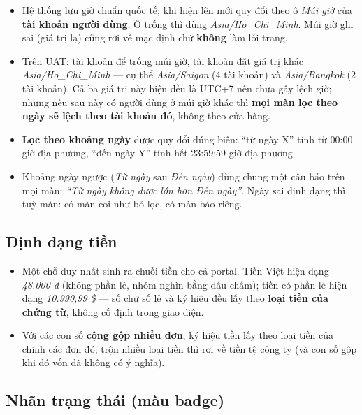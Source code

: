 \begin{itemize}[leftmargin=*]
  \item Hệ thống lưu giờ chuẩn quốc tế; khi hiện lên mới quy đổi theo ô \emph{Múi giờ} của
        \textbf{tài khoản người dùng}. Ô trống thì dùng \emph{Asia/Ho\_Chi\_Minh}. Múi giờ ghi
        sai (giá trị lạ) cũng rơi về mặc định chứ \textbf{không} làm lỗi trang.
  \item Trên UAT:  tài khoản để trống múi giờ,  tài khoản đặt giá trị khác
        \emph{Asia/Ho\_Chi\_Minh} --- cụ thể \emph{Asia/Saigon} (4 tài khoản) và
        \emph{Asia/Bangkok} (2 tài khoản). Cả ba giá trị này hiện đều là UTC+7 nên chưa gây
        lệch giờ; nhưng nếu sau này có người dùng ở múi giờ khác thì \textbf{mọi màn lọc theo
        ngày sẽ lệch theo tài khoản đó}, không theo cửa hàng.
  \item \textbf{Lọc theo khoảng ngày} được quy đổi đúng biên: ``từ ngày X'' tính từ 00:00 giờ
        địa phương, ``đến ngày Y'' tính hết 23:59:59 giờ địa phương.
  \item Khoảng ngày ngược (\emph{Từ ngày} sau \emph{Đến ngày}) dùng chung một câu báo trên mọi
        màn: \emph{``Từ ngày không được lớn hơn Đến ngày''}. Ngày sai định dạng thì tuỳ màn:
        có màn coi như bỏ lọc, có màn báo riêng.
\end{itemize}

\subsection*{Định dạng tiền}

\begin{itemize}[leftmargin=*]
  \item Một chỗ duy nhất sinh ra chuỗi tiền cho cả portal. Tiền Việt hiện dạng
        \emph{48.000 đ} (không phần lẻ, nhóm nghìn bằng dấu chấm); tiền có phần lẻ hiện dạng
        \emph{10.990,99 \$} --- số chữ số lẻ và ký hiệu đều lấy theo \textbf{loại tiền của
        chứng từ}, không cố định trong giao diện.
  \item Với các con số \textbf{cộng gộp nhiều đơn}, ký hiệu tiền lấy theo loại tiền của chính
        các đơn đó; trộn nhiều loại tiền thì rơi về tiền tệ công ty (và con số gộp khi đó vốn
        đã không có ý nghĩa).
\end{itemize}

\subsection*{Nhãn trạng thái (màu badge)}

